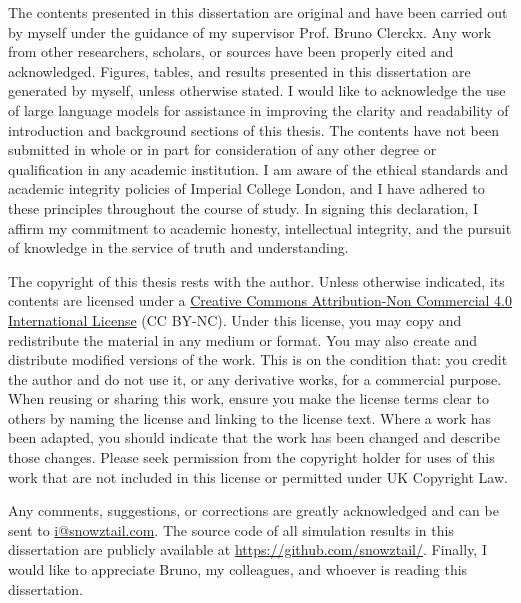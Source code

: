 
\begin{declaration}
	The contents presented in this dissertation are original and have been carried out by myself under the guidance of my supervisor Prof. Bruno Clerckx.
	Any work from other researchers, scholars, or sources have been properly cited and acknowledged.
	Figures, tables, and results presented in this dissertation are generated by myself, unless otherwise stated.
	I would like to acknowledge the use of large language models for assistance in improving the clarity and readability of introduction and background sections of this thesis.
	The contents have not been submitted in whole or in part for consideration of any other degree or qualification in any academic institution.
	I am aware of the ethical standards and academic integrity policies of Imperial College London, and I have adhered to these principles throughout the course of study.
	In signing this declaration, I affirm my commitment to academic honesty, intellectual integrity, and the pursuit of knowledge in the service of truth and understanding.

	The copyright of this thesis rests with the author. Unless otherwise indicated, its contents are licensed under a \href{https://creativecommons.org/licenses/by-nc/4.0/deed.en}{Creative Commons Attribution-Non Commercial 4.0 International License} (CC BY-NC). Under this license, you may copy and redistribute the material in any medium or format. You may also create and distribute modified versions of the work. This is on the condition that: you credit the author and do not use it, or any derivative works, for a commercial purpose. When reusing or sharing this work, ensure you make the license terms clear to others by naming the license and linking to the license text. Where a work has been adapted, you should indicate that the work has been changed and describe those changes. Please seek permission from the copyright holder for uses of this work that are not included in this license or permitted under UK Copyright Law.

	Any comments, suggestions, or corrections are greatly acknowledged and can be sent to \href{mailto:i@snowztail.com}{\url{i@snowztail.com}}.
	The source code of all simulation results in this dissertation are publicly available at \url{https://github.com/snowztail/}.
	Finally, I would like to appreciate Bruno, my colleagues, and whoever is reading this dissertation.
\end{declaration}
